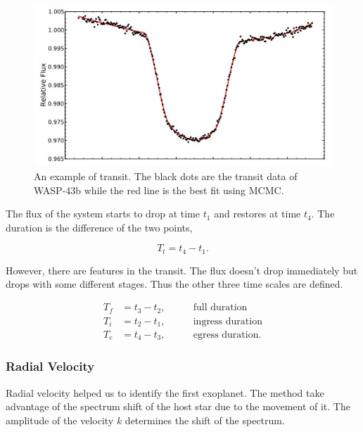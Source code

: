 \documentclass[12pt]{article}
\begin{document}
\begin{figure}
\centering
\includegraphics[width=\textwidth]{./assets/wasp43btransit}
\caption{An example of transit. The black dots are the transit data of WASP-43b while the red line is the best fit using MCMC.\cite{2014A&A...563A..41M}}
\label{fig:wasp43btransit}
\end{figure}

The flux of the system starts to drop at time $t_1$ and restores at time $t_4$. The duration is the difference of the two points,

\begin{equation}
T_t=t_4 - t_1 .
\end{equation}


However, there are features in the transit. The flux doesn't drop immediately but drops with some different stages. Thus the other three time scales are defined.

\begin{equation}
\begin{align}
T_f &= t_3 - t_2, \qquad &\text{full duration} \\
T_i &= t_2-t_1, \qquad &\text{ingress duration} \\
T_e &= t_4 - t_3, \qquad &\text{egress duration} .
\end{align}
\end{equation}








\subsubsection*{Radial Velocity}

Radial velocity helped us to identify the first exoplanet. The method take advantage of the spectrum shift of the host star due to the movement of it. The amplitude of the velocity $k$ determines the shift of the spectrum.
\end{document}
